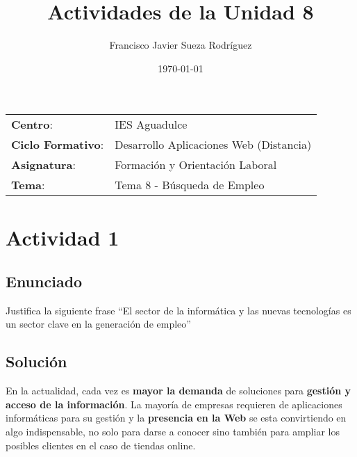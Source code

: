 


\title{
\vspace{10ex}
\normalfont \normalsize
\huge \textbf{Actividades de la Unidad 8}
}
\author{Francisco Javier Sueza Rodríguez}
\date{\normalsize\today}



\maketitle

\thispagestyle{empty}

\vspace{75ex}

\begin{center}
    \begin{tabular}{l l}
        \textbf{Centro}: & IES Aguadulce \\
        \textbf{Ciclo Formativo}: & Desarrollo Aplicaciones Web (Distancia)\\
        \textbf{Asignatura}: & Formación y Orientación Laboral\\
        \textbf{Tema}: & Tema 8 -  Búsqueda de Empleo\\
    \end{tabular}
\end{center}

\newpage

\section{Actividad 1}
\subsection{Enunciado}
Justifica la siguiente frase ``El sector de la informática y las nuevas tecnologías es un sector clave en la generación de empleo''

\subsection{Solución}
En la actualidad, cada vez es \textbf{mayor la demanda} de soluciones para \textbf{gestión y acceso de la información}. La mayoría de empresas requieren de aplicaciones informáticas para su gestión y la \textbf{presencia en la Web} se esta convirtiendo en algo indispensable, no solo para darse a conocer sino también para ampliar los posibles clientes en el caso de tiendas online.

